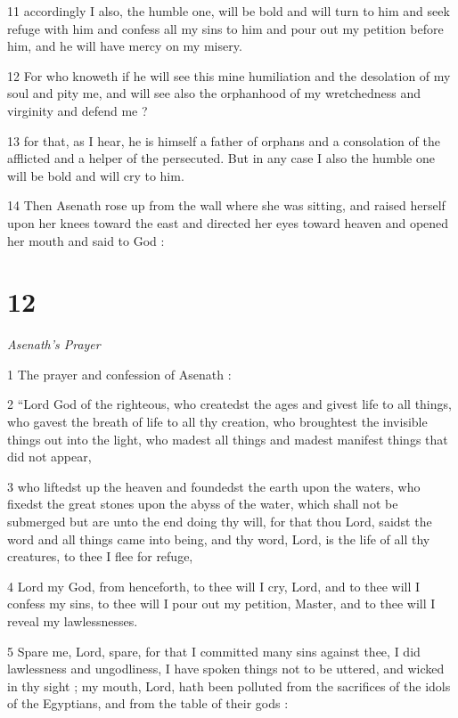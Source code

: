 11 accordingly I also, the humble one, will be bold and will turn to him and seek refuge with him and confess all my sins to him and pour out my petition before him, and he will have mercy on my misery. 

12 For who knoweth if he will see this mine humiliation and the desolation of my soul and pity me, and will see also the orphanhood of my wretchedness and virginity and defend me ? 

13 for that, as I hear, he is himself a father of orphans and a consolation of the afflicted and a helper of the persecuted. But in any case I also the humble one will be bold and will cry to him. 

14 Then Asenath rose up from the wall where she was sitting, and raised herself upon her knees toward the east and directed her eyes toward heaven and opened her mouth and said to God : 

\chapter{12}

\par \textit{Asenath's Prayer}

1 The prayer and confession of Asenath : 

2 “Lord God of the righteous, who createdst the ages and givest life to all things, 
who gavest the breath of life to all thy creation, 
who broughtest the invisible things out into the light, 
who madest all things and madest manifest things that did not appear, 

3 who liftedst up the heaven and foundedst the earth upon the waters, 
who fixedst the great stones upon the abyss of the water, 
which shall not be submerged but are unto the end doing thy will, 
for that thou Lord, saidst the word and all things came into being, and thy word, Lord, is the life of all thy creatures, to thee I flee for refuge, 

4 Lord my God, from henceforth, to thee will I cry, Lord, 
and to thee will I confess my sins, to thee will I pour out my petition, Master, 
and to thee will I reveal my lawlessnesses. 

5 Spare me, Lord, spare, for that I committed many sins against thee, 
I did lawlessness and ungodliness, 
I have spoken things not to be uttered, and wicked in thy sight ; 
my mouth, Lord, hath been polluted from the sacrifices of the idols of the Egyptians, 
and from the table of their gods : 

